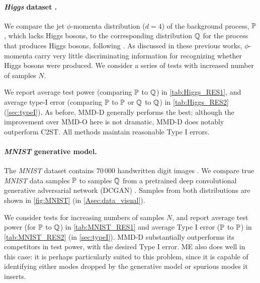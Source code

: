\documentclass{article}
\begin{document}
\vspace{-1.5ex}\paragraph{\emph{Higgs} dataset \citep{Baldi_Higgs_datasets}.}
We compare the jet $\phi$-momenta distribution ($d = 4$) of the background process, $\P$, which lacks Higgs bosons,
to the corresponding distribution $\Q$ for the process that produces Higgs bosons,
following \citet{Chwialkowski2015}.
As discussed in these previous works, $\phi$-momenta carry very little discriminating information for recognizing whether Higgs bosons were produced.
We consider a series of tests with increased number of samples $N$.

We report average test power (comparing $\P$ to $\Q$) in \cref{tab:Higgs_RES1},
and average type-I error (comparing $\P$ to $\P$ or $\Q$ to $\Q$) in \cref{tab:Higgs_RES2} (\cref{sec:typeI}).
As before, MMD-D generally performs the best;
although the improvement over MMD-O here is not dramatic,
MMD-D does notably outperform C2ST.
All methods maintain reasonable Type I errors.


\vspace{-1.5ex}\paragraph{\emph{MNIST} generative model.}
The \emph{MNIST} dataset contains $70\,000$ handwritten digit images  \citep{lecun1998gradient}.
We compare true \emph{MNIST} data samples $\P$
to samples $\Q$ from a pretrained {deep convolutional generative adversarial network} (DCGAN) \citep{DCGAN_Radford}.
Samples from both distributions are shown in \cref{fig:MNIST} (in \cref{Asec:data_visual}).

We consider tests for increasing numbers of samples $N$,
and report average test power (for $\P$ to $\Q$) in \cref{tab:MNIST_RES1}
and average Type I error ($\P$ to $\P$) in \cref{tab:MNIST_RES2} (in \cref{sec:typeI}).
MMD-D substantially outperforms its competitors in test power,
with the desired Type I error.
ME also does well in this case:
it is perhaps particularly suited to this problem,
since it is capable of identifying either modes dropped by the generative model or spurious modes it inserts.
\end{document}
